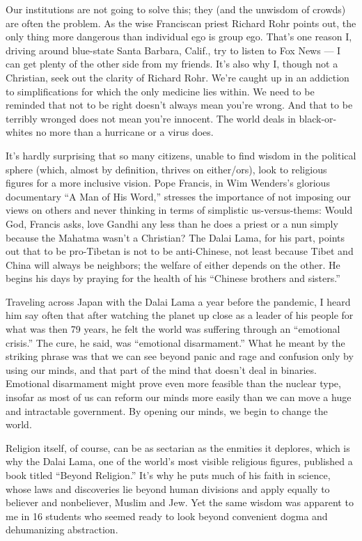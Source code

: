 Our institutions are not going to solve this; they (and the unwisdom of
crowds) are often the problem. As the wise Franciscan priest Richard
Rohr points out, the only thing more dangerous than individual ego is
group ego. That's one reason I, driving around blue-state Santa Barbara,
Calif., try to listen to Fox News --- I can get plenty of the other side
from my friends. It's also why I, though not a Christian, seek out the
clarity of Richard Rohr. We're caught up in an addiction to
simplifications for which the only medicine lies within. We need to be
reminded that not to be right doesn't always mean you're wrong. And that
to be terribly wronged does not mean you're innocent. The world deals in
black-or-whites no more than a hurricane or a virus does.

It's hardly surprising that so many citizens, unable to find wisdom in
the political sphere (which, almost by definition, thrives on
either/ors), look to religious figures for a more inclusive vision. Pope
Francis, in Wim Wenders's glorious documentary ``A Man of His Word,''
stresses the importance of not imposing our views on others and never
thinking in terms of simplistic us-versus-thems: Would God, Francis
asks, love Gandhi any less than he does a priest or a nun simply because
the Mahatma wasn't a Christian? The Dalai Lama, for his part, points out
that to be pro-Tibetan is not to be anti-Chinese, not least because
Tibet and China will always be neighbors; the welfare of either depends
on the other. He begins his days by praying for the health of his
``Chinese brothers and sisters.''

Traveling across Japan with the Dalai Lama a year before the pandemic, I
heard him say often that after watching the planet up close as a leader
of his people for what was then 79 years, he felt the world was
suffering through an ``emotional crisis.'' The cure, he said, was
``emotional disarmament.'' What he meant by the striking phrase was that
we can see beyond panic and rage and confusion only by using our minds,
and that part of the mind that doesn't deal in binaries. Emotional
disarmament might prove even more feasible than the nuclear type,
insofar as most of us can reform our minds more easily than we can move
a huge and intractable government. By opening our minds, we begin to
change the world.

Religion itself, of course, can be as sectarian as the enmities it
deplores, which is why the Dalai Lama, one of the world's most visible
religious figures, published a book titled ``Beyond Religion.'' It's why
he puts much of his faith in science, whose laws and discoveries lie
beyond human divisions and apply equally to believer and nonbeliever,
Muslim and Jew. Yet the same wisdom was apparent to me in 16 students
who seemed ready to look beyond convenient dogma and dehumanizing
abstraction.


